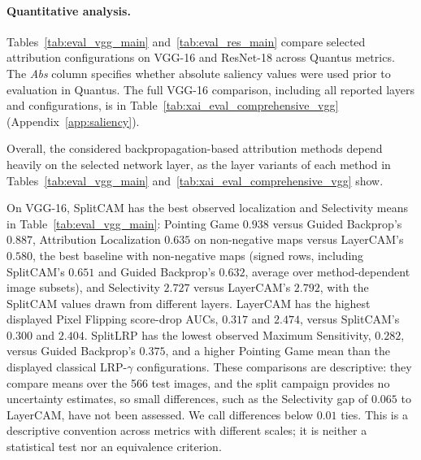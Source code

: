 

\paragraph{Quantitative analysis.}
Tables~\ref{tab:eval_vgg_main} and~\ref{tab:eval_res_main} compare selected attribution configurations on VGG-16 and ResNet-18 across Quantus metrics. The \emph{Abs} column specifies whether absolute saliency values were used prior to evaluation in Quantus. The full VGG-16 comparison, including all reported layers and configurations, is in Table~\ref{tab:xai_eval_comprehensive_vgg} (Appendix~\ref{app:saliency}).

Overall, the considered backpropagation-based attribution methods depend heavily on the selected network layer, as the layer variants of each method in Tables~\ref{tab:eval_vgg_main} and~\ref{tab:xai_eval_comprehensive_vgg} show.

On VGG-16, SplitCAM has the best observed localization and Selectivity means in Table~\ref{tab:eval_vgg_main}: Pointing Game $0.938$ versus Guided Backprop's $0.887$, Attribution Localization $0.635$ on non-negative maps versus LayerCAM's $0.580$, the best baseline with non-negative maps (signed rows, including SplitCAM's $0.651$ and Guided Backprop's $0.632$, average over method-dependent image subsets), and Selectivity $2.727$ versus LayerCAM's $2.792$, with the SplitCAM values drawn from different layers. LayerCAM has the highest displayed Pixel Flipping score-drop AUCs, $0.317$ and $2.474$, versus SplitCAM's $0.300$ and $2.404$. SplitLRP has the lowest observed Maximum Sensitivity, $0.282$, versus Guided Backprop's $0.375$, and a higher Pointing Game mean than the displayed classical LRP-$\gamma$ configurations. These comparisons are descriptive: they compare means over the 566 test images, and the split campaign provides no uncertainty estimates, so small differences, such as the Selectivity gap of $0.065$ to LayerCAM, have not been assessed. We call differences below $0.01$ ties. This is a descriptive convention across metrics with different scales; it is neither a statistical test nor an equivalence criterion.

